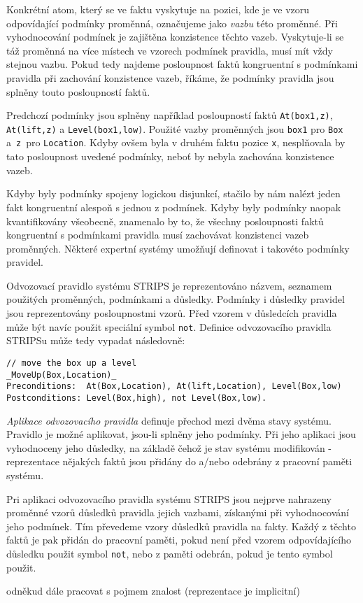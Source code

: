 Konkrétní atom, který se ve faktu vyskytuje na pozici, kde je ve vzoru
odpovídající podmínky proměnná, označujeme jako \emph{vazbu} této proměnné. Při
vyhodnocování podmínek je zajištěna konzistence těchto vazeb. Vyskytuje-li se
táž proměnná na více místech ve vzorech podmínek pravidla, musí mít vždy stejnou
vazbu. Pokud tedy najdeme posloupnost faktů kongruentní s podmínkami pravidla
při zachování konzistence vazeb, říkáme, že podmínky pravidla jsou splněny touto
posloupností faktů.

Predchozí podmínky jsou splněny například posloupností faktů \verb|At(box1,z)|,
\verb|At(lift,z)| a \verb|Level(box1,low)|. Použité vazby proměnných jsou
\verb|box1| pro \verb|Box| a~\verb|z|~pro \verb|Location|. Kdyby ovšem byla v
druhém faktu pozice \verb|x|, nesplňovala by tato posloupnost uvedené podmínky,
neboť by nebyla zachována konzistence vazeb.

Kdyby byly podmínky spojeny logickou disjunkcí, stačilo by nám nalézt jeden
fakt kongruentní alespoň s jednou z podmínek. Kdyby byly podmínky naopak
kvantifikovány všeobecně, znamenalo by to, že všechny posloupnosti faktů
kongruentní s podmínkami pravidla musí zachovávat konzistenci vazeb proměnných.
Některé expertní systémy umožňují definovat i takovéto podmínky pravidel.

Odvozovací pravidlo systému STRIPS je reprezentováno názvem, seznamem použitých
proměnných, podmínkami a důsledky. Podmínky i důsledky pravidel jsou
reprezentovány posloupnostmi vzorů. Před vzorem v důsledcích pravidla může být
navíc použit speciální symbol \verb|not|. Definice odvozovacího pravidla STRIPSu
může tedy vypadat následovně:
\begin{verbatim}
// move the box up a level
_MoveUp(Box,Location)_
Preconditions:  At(Box,Location), At(lift,Location), Level(Box,low)
Postconditions: Level(Box,high), not Level(Box,low).
\end{verbatim}

\emph{Aplikace odvozovacího pravidla} definuje přechod mezi dvěma stavy
systému. Pravidlo je možné aplikovat, jsou-li splněny jeho podmínky. Při jeho
aplikaci jsou vyhodnoceny jeho důsledky, na základě čehož je stav systému
modifikován - reprezentace nějakých faktů jsou přidány do a/nebo odebrány z
pracovní paměti systému.

Pri aplikaci odvozovacího pravidla systému STRIPS jsou nejprve nahrazeny
proměnné vzorů důsledků pravidla jejich vazbami, získanými při vyhodnocování
jeho podmínek. Tím převedeme vzory důsledků pravidla na fakty. Každý z těchto
faktů je pak přidán do pracovní paměti, pokud není před vzorem odpovídajícího
důsledku použit symbol \verb|not|, nebo z paměti odebrán, pokud je tento symbol
použit.

\begin{framed}
odněkud dále pracovat s pojmem znalost (reprezentace je implicitní)
\end{framed}
